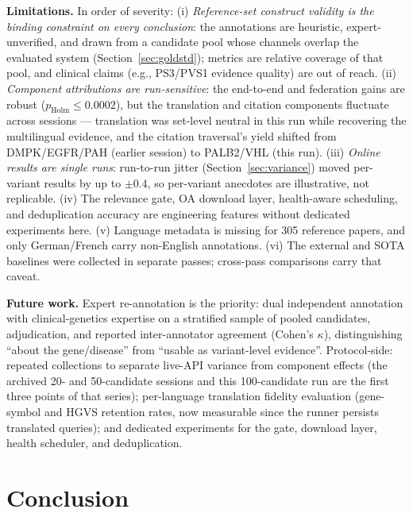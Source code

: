 \documentclass[sigconf,screen]{acmart}
\begin{document}
\textbf{Limitations.} In order of severity: (i) \emph{Reference-set
construct validity is the binding constraint on every conclusion}: the
annotations are heuristic, expert-unverified, and drawn from a candidate
pool whose channels overlap the evaluated system
(Section~\ref{sec:goldstd}); metrics are relative coverage of that pool,
and clinical claims (e.g., PS3/PVS1 evidence quality) are out of reach.
(ii) \emph{Component attributions are run-sensitive}: the end-to-end and
federation gains are robust ($p_{\text{Holm}} \le 0.0002$), but the
translation and citation components fluctuate across sessions ---
translation was set-level neutral in this run while recovering the
multilingual evidence, and the citation traversal's yield shifted from
DMPK/EGFR/PAH (earlier session) to PALB2/VHL (this run). (iii)
\emph{Online results are single runs}: run-to-run jitter
(Section~\ref{sec:variance}) moved per-variant results by up to
$\pm0.4$, so per-variant anecdotes are illustrative, not replicable. (iv)
The relevance gate, OA download layer, health-aware scheduling, and
deduplication accuracy are engineering features without dedicated
experiments here. (v) Language metadata is missing for 305 reference
papers, and only German/French carry non-English annotations. (vi) The
external and SOTA baselines were collected in separate passes; cross-pass
comparisons carry that caveat.

\textbf{Future work.} Expert re-annotation is the priority: dual
independent annotation with clinical-genetics expertise on a stratified
sample of pooled candidates, adjudication, and reported inter-annotator
agreement (Cohen's $\kappa$), distinguishing ``about the gene/disease''
from ``usable as variant-level evidence''. Protocol-side: repeated
collections to separate live-API variance from component effects (the
archived 20- and 50-candidate sessions and this 100-candidate run are the
first three points of that series); per-language translation fidelity
evaluation (gene-symbol and HGVS retention rates, now measurable since
the runner persists translated queries); and dedicated experiments for
the gate, download layer, health
scheduler, and deduplication.

\section{Conclusion}
\label{sec:conclusion}
\end{document}
